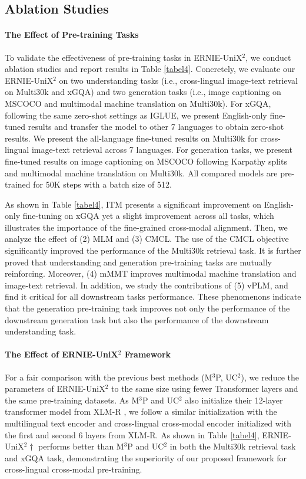 \documentclass{article}
\begin{document}
\subsection{Ablation Studies}
\paragraph{The Effect of Pre-training Tasks}
To validate the effectiveness of pre-training tasks in ERNIE-UniX$^{2}$, we conduct ablation studies and report results in Table \ref{tabel4}. Concretely, we evaluate our ERNIE-UniX$^{2}$ on two understanding tasks (i.e.,  cross-lingual image-text retrieval on Multi30k and xGQA) and two generation tasks (i.e., image captioning on MSCOCO and multimodal machine translation on Multi30k). For xGQA, following the same zero-shot settings as IGLUE, we present English-only fine-tuned results and transfer the model to other 7 languages to obtain zero-shot results. We present the all-language fine-tuned results on Multi30k for cross-lingual image-text retrieval across 7 languages. For generation tasks, we present fine-tuned results on image captioning on MSCOCO following Karpathy splits and multimodal machine translation on Multi30k. All compared models are pre-trained for 50K steps with a batch size of 512.

As shown in Table \ref{tabel4}, ITM presents a significant improvement on English-only fine-tuning on xGQA yet a slight improvement across all tasks, which illustrates the importance of the fine-grained cross-modal alignment. Then, we analyze the effect of (2) MLM and (3) CMCL. The use of the CMCL objective significantly improved the performance of the Multi30k retrieval task. It is further proved that understanding and generation pre-training tasks are mutually reinforcing. Moreover, (4) mMMT improves multimodal machine translation and image-text retrieval. In addition, we study the contributions of (5) vPLM, and find it critical for all downstream tasks performance. These phenomenons indicate that the generation pre-training task improves not only the performance of the downstream generation task but also the performance of the downstream understanding task. 

\paragraph{The Effect of ERNIE-UniX$^2$ Framework}
For a fair comparison with the previous best methods (M$^3$P, UC$^2$), we reduce the parameters of ERNIE-UniX$^2$ to the same size using fewer Transformer layers and the same pre-training datasets. As M$^3$P and UC$^2$ also initialize their 12-layer transformer model from XLM-R \cite{xlmr2019}, we follow a similar initialization with the multilingual text encoder and cross-lingual cross-modal encoder initialized with the first and second 6 layers from XLM-R. As shown in Table \ref{tabel4}, ERNIE-UniX$^2\dagger$ performs better than M$^3$P and UC$^2$ in both the Multi30k retrieval task and xGQA task, demonstrating the superiority of our proposed framework for cross-lingual cross-modal pre-training. 
\end{document}
